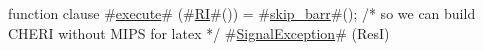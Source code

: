 function clause #\hyperref[zexecute]{execute}# (#\hyperref[zRI]{RI}#()) =
{
  #\hyperref[zskipzybarr]{skip\_barr}#(); /* so we can build CHERI without MIPS for latex  */
  #\hyperref[zSignalException]{SignalException}# (ResI)
}
